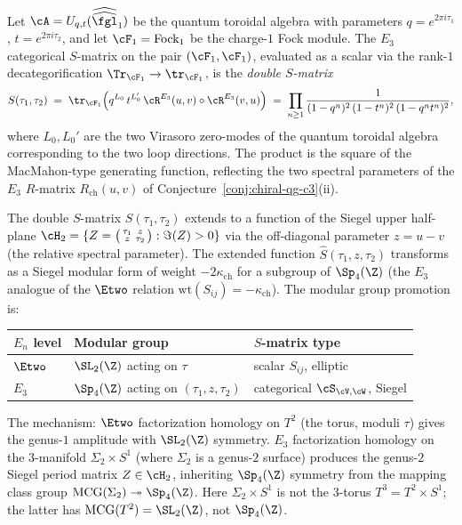 \begin{conjecture}
\label{conj:double-s-matrix}
\ClaimStatusConjectured
Let $\cA = U_{q,t}(\widehat{\widehat{\fgl}}_1)$ be the quantum
toroidal algebra with parameters $q = e^{2\pi i \tau_1}$,
$t = e^{2\pi i \tau_2}$, and let
$\cF_1 = \mathrm{Fock}_1$ be the charge-$1$ Fock module. The
$E_3$ categorical $S$-matrix on the pair $(\cF_1, \cF_1)$,
evaluated as a scalar via the rank-$1$ decategorification
$\Tr_{\cF_1} \to \tr_{\cF_1}$, is the \emph{double $S$-matrix}
\[
 S(\tau_1, \tau_2)
 \;=\;
 \tr_{\cF_1}\!\left(
 q^{L_0}\, t^{L_0'}\,
 \cR^{E_3}(u,v) \circ \cR^{E_3}(v,u)
 \right)
 \;=\;
 \prod_{n \geq 1}
 \frac{1}{(1 - q^n)^2\,(1 - t^n)^2\,(1 - q^n t^n)^2},
\]
where $L_0, L_0'$ are the two Virasoro zero-modes of the
quantum toroidal algebra corresponding to the two loop
directions. The product is the square of the MacMahon-type
generating function, reflecting the two spectral parameters
of the $E_3$ $R$-matrix $R_{\mathrm{ch}}(u,v)$ of
Conjecture~\textup{\ref{conj:chiral-qg-c3}(ii)}.
\end{conjecture}

\begin{conjecture}
\label{conj:sp4-modularity}
\ClaimStatusConjectured
The double $S$-matrix $S(\tau_1, \tau_2)$ extends to a function of the
Siegel upper half-plane $\cH_2 = \{Z = \bigl(\begin{smallmatrix}
\tau_1 & z \\ z & \tau_2 \end{smallmatrix}\bigr) :
\Im(Z) > 0\}$ via the off-diagonal parameter
$z = u - v$ (the relative spectral parameter). The extended function
$\hat{S}(\tau_1, z, \tau_2)$ transforms as a Siegel modular form
of weight $-2\kappa_{\mathrm{ch}}$ for a subgroup of $\Sp_4(\Z)$
(the $E_3$ analogue of the $\Etwo$ relation
$\mathrm{wt}(S_{ij}) = -\kappa_{\mathrm{ch}}$).
The modular group promotion is:
\begin{center}
\renewcommand{\arraystretch}{1.2}
\begin{tabular}{lll}
 \toprule
 $E_n$ level & Modular group & $S$-matrix type \\
 \midrule
 $\Etwo$ & $\SL_2(\Z)$ acting on $\tau$ & scalar $S_{ij}$, elliptic \\
 $E_3$ & $\Sp_4(\Z)$ acting on $(\tau_1, z, \tau_2)$ &
 categorical $\cS_{\cV,\cW}$, Siegel \\
 \bottomrule
\end{tabular}
\end{center}
The mechanism: $\Etwo$ factorization homology on $T^2$ (the torus,
moduli $\tau$) gives the genus-$1$ amplitude with $\SL_2(\Z)$ symmetry.
$E_3$ factorization homology on the $3$-manifold
$\Sigma_2 \times S^1$ (where $\Sigma_2$ is a genus-$2$ surface)
produces the genus-$2$ Siegel period matrix $Z \in \cH_2$, inheriting
$\Sp_4(\Z)$ symmetry from the mapping class group
$\mathrm{MCG}(\Sigma_2) \twoheadrightarrow \Sp_4(\Z)$.
Here $\Sigma_2 \times S^1$ is not the $3$-torus
$T^3 = T^2 \times S^1$; the latter has
$\mathrm{MCG}(T^2) = \SL_2(\Z)$, not $\Sp_4(\Z)$.
\end{conjecture}

